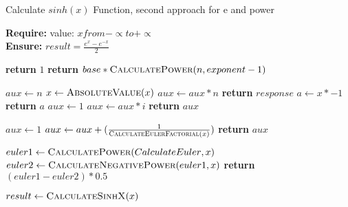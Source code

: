 \documentclass[12pt]{report}
\begin{document}
\begin{algorithm}

\caption{Calculate $sinh(x)$ Function, second approach for e and power}

\textbf{Require:}  value: $x from -\propto to + \propto$  \\
\textbf{Ensure:} $result = \frac{e^x- e^{-x}}{2}$
\begin{algorithmic}[1]

    \State \textbf{return} $1$
    \EndIf
    \State \textbf{return} $base*\Call{CalculatePower}{n,exponent-1}$
    \EndProcedure
\Statex


    \State $aux \leftarrow n$
    \State $x \leftarrow  \Call{AbsoluteValue}{x} $
    \State $aux \leftarrow aux * n$
    \EndFor
    \State \textbf{return} $response$
    \EndProcedure
\Statex
{}
    \State $a \leftarrow x*-1$
    \State \textbf{return} $a$
    \EndProcedure
\Statex
{}
    \State $aux \leftarrow 1$
    \State $aux \leftarrow aux * i$
    \EndFor
    \State \textbf{return} $aux$
    \EndProcedure
\Statex

    \State $aux \leftarrow 1$
    \State $aux \leftarrow aux+(\frac{1}{\Call{CalculateEulerFactorial}{x}})$
    \EndFor
    \State \textbf{return} $aux$
    \EndProcedure
\Statex

   \State $euler1 \leftarrow \Call{CalculatePower}{CalculateEuler{ },x} $ 
   \State $euler2 \leftarrow \Call{CalculateNegativePower}{euler1,x} $
    \State \textbf{return} $(euler1-euler2)*0.5${}
    \EndProcedure
\Statex



\State $ result \leftarrow \Call{CalculateSinhX}{x}$
\end{algorithmic}
\end{algorithm}
\end{document}
